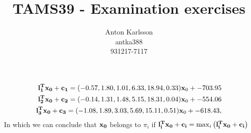 \message{ !name(examination.tex)}\documentclass[two column]{report}
\title{TAMS39 - Examination exercises}
\author{Anton Karlsson\\antka388\\931217-7117}
\date{}
\begin{document}
\begin{align*}
{\bf l_1^T x_0 + c_1} = (-0.57, 1.80, 1.01, 6.33, 18.94, 0.33){\bf x}_0 + -703.95 \\ 
{\bf l_2^T x_0 + c_2} = (-0.14, 1.31, 1.48, 5.15, 18.31, 0.04){\bf x}_0 + -554.06 \\ 
{\bf l_3^T x_0 + c_3} = (-1.08, 1.89, 3.03, 5.69, 15.11, 0.51){\bf x}_0 + -618.43, 
\end{align*}
In which we can conclude that ${\bf x_0}$ belongs to  $\pi_i$ if ${\bf
  l_i^T x_0 + c_i} = \max_i \left( {\bf  l_i^T x_0 + c_i}\right)$


\end{document}
